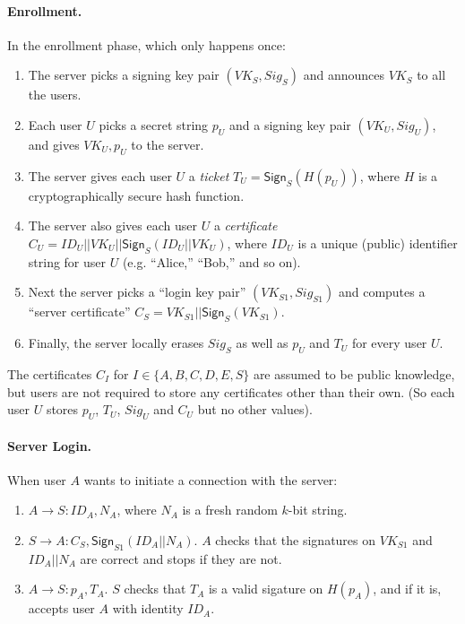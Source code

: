 \documentclass[11pt]{article}
\begin{document}
\paragraph{Enrollment.}  In the enrollment phase, which only happens once:
\begin{enumerate}
\item The server picks a signing key pair $(VK_S,Sig_S)$ and announces
  $VK_S$ to all the users.

\item Each user $U$ picks a secret string $p_U$ and a signing key pair $(VK_U, Sig_U)$,
and gives $VK_U, p_U$ to the server.

\item The server gives each user $U$ a {\em ticket} $T_U =
  \mathsf{Sign}_S(H(p_U))$, where $H$ is a cryptographically secure
  hash function.

\item The server also gives each user $U$ a {\em certificate} $C_U =
  ID_U || VK_U || \mathsf{Sign}_S(ID_U||VK_U)$, where $ID_U$ is a
  unique (public) identifier string for user $U$ (e.g. ``Alice,''
  ``Bob,'' and so on).

\item Next the server picks a ``login key pair'' $(VK_{S1}, Sig_{S1})$
  and computes a ``server certificate'' $C_S =
  VK_{S1} || \mathsf{Sign}_S(VK_{S1})$.

\item Finally, the server locally erases $Sig_S$ as well as $p_U$ and
  $T_U$ for every user $U$.
\end{enumerate}
The certificates $C_I$ for $I \in \{A,B,C,D,E,S\}$ are assumed to be
public knowledge, but users are not required to store any certificates
other than their own.   (So each user $U$ stores $p_U$, $T_U$, $Sig_U$ and
$C_U$ but no other values).

\paragraph{Server Login.}  When user $A$ wants to initiate a
connection with the server:
\begin{enumerate}
\item $A \longrightarrow S : ID_A, N_A$, where $N_A$ is a fresh random
  $k$-bit string.
\item $S \longrightarrow A: C_S, \mathsf{Sign}_{S1}(ID_A || N_A)$.  $A$ checks that the
  signatures on $VK_{S1}$ and $ID_A || N_A$ are correct and stops if they
  are not.
\item $A \longrightarrow S: p_A, T_A$.  $S$ checks that $T_A$ is a valid
  sigature on $H(p_A)$, and if it is, accepts user $A$ with identity $ID_A$.
\end{enumerate}
\end{document}
